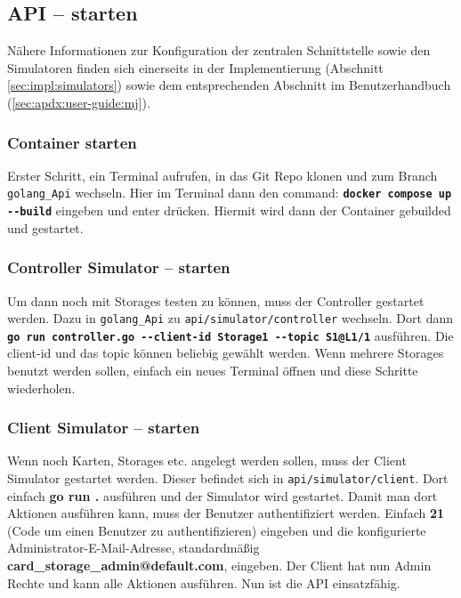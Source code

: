 \newpage

\subsection{API – starten}
Nähere Informationen zur Konfiguration der zentralen Schnittstelle sowie den Simulatoren finden sich einerseits in der Implementierung (Abschnitt \ref{sec:impl:simulators}) sowie dem entsprechenden Abschnitt im Benutzerhandbuch (\ref{sec:apdx:user-guide:mj}). 

\subsubsection{Container starten}
Erster Schritt, ein Terminal aufrufen, in das Git Repo klonen und zum Branch \texttt{golang\_Api} wechseln. Hier im Terminal dann den command: \textbf{\texttt{docker compose up -{}-build}} eingeben und enter drücken. Hiermit wird dann der Container gebuilded und gestartet.

\subsubsection{Controller Simulator – starten}
Um dann noch mit Storages testen zu können, muss der Controller gestartet werden. Dazu in \texttt{golang\_Api} zu \texttt{api/simulator/controller} wechseln. Dort dann \textbf{\texttt{go run controller.go -{}-client-id Storage1 -{}-topic S1@L1/1}} ausführen. Die client-id und das topic können beliebig gewählt werden. Wenn mehrere Storages benutzt werden sollen, einfach ein neues Terminal öffnen und diese Schritte wiederholen.

\subsubsection{Client Simulator – starten}
Wenn noch Karten, Storages etc. angelegt werden sollen, muss der Client Simulator gestartet werden. Dieser befindet sich in \texttt{api/simulator/client}. Dort einfach \textbf{go run .} ausführen und der Simulator wird gestartet. Damit man dort Aktionen ausführen kann, muss der Benutzer authentifiziert werden. Einfach \textbf{21} (Code um einen Benutzer zu authentifizieren) eingeben und die konfigurierte Administrator-E-Mail-Adresse, standardmäßig \textbf{card\_storage\_admin@default.com}, eingeben. Der Client hat nun Admin Rechte und kann alle Aktionen ausführen.
\medskip
Nun ist die API einsatzfähig.

\newpage

